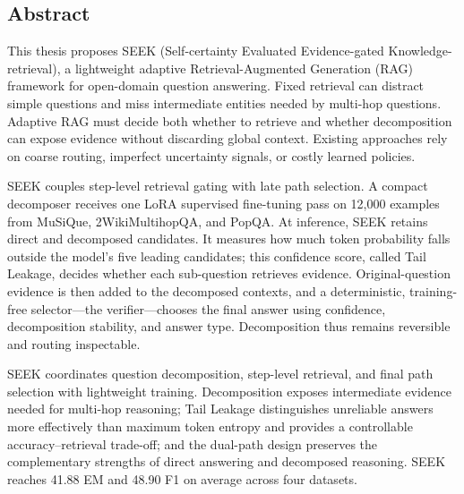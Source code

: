 \documentclass{nthu_thesis}
\begin{document}
\begin{thesiscjk}

% 



\frontmatter %



\chapter*{Abstract}
This thesis proposes SEEK (Self-certainty Evaluated Evidence-gated Knowledge-retrieval), a lightweight adaptive Retrieval-Augmented Generation (RAG) framework for open-domain question answering. Fixed retrieval can distract simple questions and miss intermediate entities needed by multi-hop questions. Adaptive RAG must decide both whether to retrieve and whether decomposition can expose evidence without discarding global context. Existing approaches rely on coarse routing, imperfect uncertainty signals, or costly learned policies.

SEEK couples step-level retrieval gating with late path selection. A compact decomposer receives one LoRA supervised fine-tuning pass on 12,000 examples from MuSiQue, 2WikiMultihopQA, and PopQA. At inference, SEEK retains direct and decomposed candidates. It measures how much token probability falls outside the model's five leading candidates; this confidence score, called Tail Leakage, decides whether each sub-question retrieves evidence. Original-question evidence is then added to the decomposed contexts, and a deterministic, training-free selector---the verifier---chooses the final answer using confidence, decomposition stability, and answer type. Decomposition thus remains reversible and routing inspectable.

SEEK coordinates question decomposition, step-level retrieval, and final path selection with lightweight training. Decomposition exposes intermediate evidence needed for multi-hop reasoning; Tail Leakage distinguishes unreliable answers more effectively than maximum token entropy and provides a controllable accuracy--retrieval trade-off; and the dual-path design preserves the complementary strengths of direct answering and decomposed reasoning. SEEK reaches 41.88 EM and 48.90 F1 on average across four datasets.


\end{thesiscjk}
\end{document}
